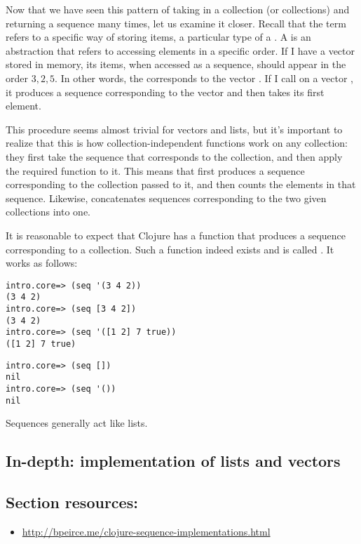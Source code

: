 Now that we have seen this pattern of taking in a collection (or collections) and returning a sequence many times, let us examine it closer. Recall that the term  refers to a specific way of storing items, a particular type of a . A  is an abstraction that refers to accessing elements in a specific order. If I have a vector \clocode{[3 2 5]} stored in memory, its items, when accessed as a sequence, should appear in the order $3, 2, 5$. In other words, the   corresponds to the vector \clocode{[3 2 5]}. If I call  on a vector  \clocode{[3 2 5]}, it produces a sequence corresponding to the vector and then takes its first element. 

This procedure seems almost trivial for vectors and lists, but it's important to realize that this is how collection-independent functions work on any collection: they first take the sequence that corresponds to the collection, and then apply the required function to it. This means that  first produces a sequence corresponding to the collection passed to it, and then counts the elements in that sequence. Likewise,  concatenates sequences corresponding to the two given collections into one. 

It is reasonable to expect that Clojure has a function that produces a sequence corresponding to a collection. Such a function indeed exists and is called . It works as follows:
\begin{framed}
\begin{verbatim}
intro.core=> (seq '(3 4 2))
(3 4 2)
intro.core=> (seq [3 4 2])
(3 4 2)
intro.core=> (seq '([1 2] 7 true))
([1 2] 7 true)
\end{verbatim}
\end{framed} 

\begin{framed}
\begin{verbatim}
intro.core=> (seq [])
nil
intro.core=> (seq '())
nil
\end{verbatim}
\end{framed} 

Sequences generally act like lists. 




\subsection{In-depth: implementation of lists and vectors}\label{subsec:implement}


\subsection{Section resources:}
\begin{itemize}
\item \url{http://bpeirce.me/clojure-sequence-implementations.html}
\end{itemize}

